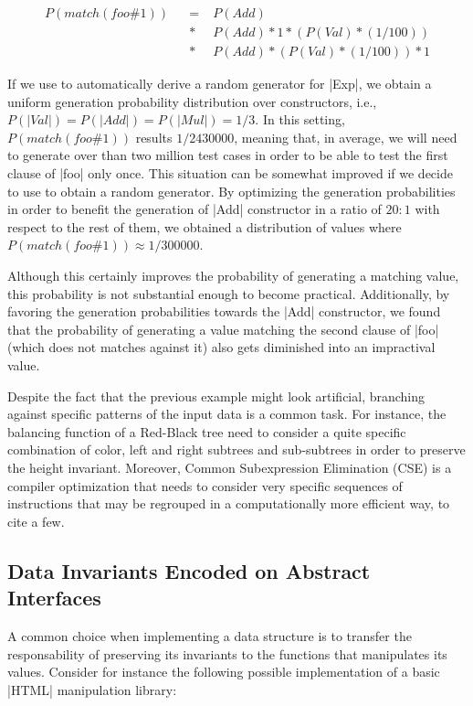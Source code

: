 \begin{align*}
  P(match(foo\#1))
  \!&&=\; &P(Add) \\
  \!&&*\; &P(Add) * 1 * (P(Val) * (1/100)) \\
  \!&&*\; &P(Add) * (P(Val) * (1/100)) * 1
\end{align*}

If we use \megadeth to automatically derive a random generator for |Exp|, we
obtain a uniform generation probability distribution over constructors, i.e.,
$P(|Val|) = P(|Add|) = P(|Mul|) = 1/3$.
%
In this setting, $P(match(foo\#1))$ results $1/2430000$, meaning that, in
average, we will need to generate over than two million test cases in order to
be able to test the first clause of |foo| only once.
%
This situation can be somewhat improved if we decide to use \dragen to obtain a
random generator.
%
By optimizing the generation probabilities in order to benefit the generation of
|Add| constructor in a ratio of $20:1$ with respect to the rest of them, we
obtained a distribution of values where $P(match(foo\#1)) \approx 1/300000$.

%
Although this certainly improves the probability of generating a matching value,
this probability is not substantial enough to become practical.
%
Additionally, by favoring the generation probabilities towards the |Add|
constructor, we found that the probability of generating a value matching the
second clause of |foo| (which does not matches against it) also gets diminished
into an impractival value.


Despite the fact that the previous example might look artificial, branching
against specific patterns of the input data is a common task.
%
For instance, the balancing function of a Red-Black tree need to consider a
quite specific combination of color, left and right subtrees and sub-subtrees
in order to preserve the height invariant.
%
Moreover, Common Subexpression Elimination (CSE) is a compiler optimization that
needs to consider very specific sequences of instructions that may be regrouped
in a computationally more efficient way, to cite a few.



\subsection{\textbf{Data Invariants Encoded on Abstract Interfaces}}

A common choice when implementing a data structure is to transfer the
responsability of preserving its invariants to the functions that manipulates
its values.
%
Consider for instance the following possible implementation of a basic |HTML|
manipulation library:

